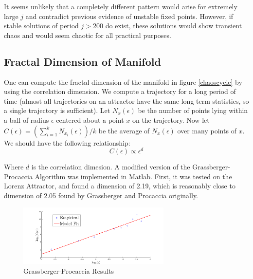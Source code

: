 \documentclass[12pt,journal,compsoc,twoside]{IEEEtran}
\begin{document}
It seems unlikely that a completely different pattern would arise for extremely large $j$ and contradict previous evidence of unstable fixed points. However, if stable solutions of period $j > 200$ do exist, these solutions would show transient chaos and would seem chaotic for all practical purposes.  

%

\subsection{Fractal Dimension of Manifold}

One can compute the fractal dimension of the manifold in figure \ref{chaoscycle} by using the correlation dimension. We compute a trajectory for a long period of time (almost all trajectories on an attractor have the same long term statistics, so a single trajectory is sufficient). Let $N_{x}(\epsilon)$ be the number of points lying within a ball of radius $\epsilon$ centered about a point $x$ on the trajectory. Now let $C(\epsilon) = ( \sum_{i = 1}^{k} N_{x_i}(\epsilon) ) / k$ be the average of $N_x (\epsilon)$ over many points of $x$. We should have the following relationship:
\begin{equation}
C(\epsilon) \propto \epsilon^d
\end{equation}

Where $d$ is the correlation dimesion. A modified version of the Grassberger-Procaccia Algorithm was implemented in Matlab. First, it was tested on the Lorenz Attractor, and found a dimension of 2.19, which is reasonably close to dimension of 2.05 found by Grassberger and Procaccia originally. 
\begin{figure}[h!]
\centering
\includegraphics[width=3in]{fractaldimen.png}
\caption{Grassberger-Procaccia  Results}
\label{fractaldimen}
\end{figure}
\end{document}
